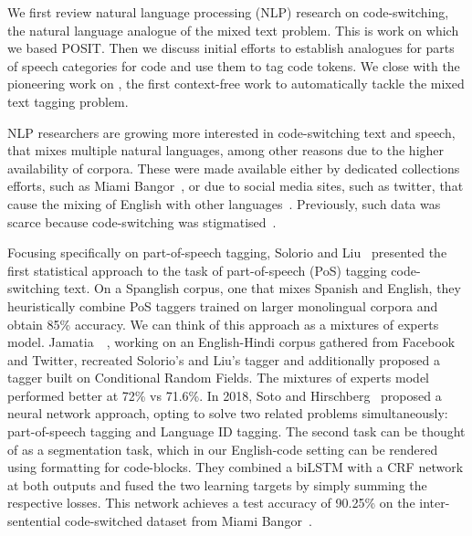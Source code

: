 We first review natural language processing (NLP) research on code-switching,
the natural language analogue of the mixed text problem.  This is work on which
we based POSIT.  Then we discuss initial efforts to establish analogues for
parts of speech categories for code and use them to tag code tokens.  We close
with the pioneering work on \stormed, the first context-free work to
automatically tackle the mixed text tagging problem.

NLP researchers are growing more interested in code-switching text and speech,
\ie that mixes multiple natural languages, among other reasons due to the higher
availability of corpora. These were made available either by dedicated
collections efforts, such as Miami Bangor~\cite{bangorTalk}, or due to social
media sites, such as twitter, that cause the mixing of English with other
languages~\cite{Vyas2014}. Previously, such data was scarce because
code-switching was stigmatised~\cite{Poplack1980}. 

Focusing specifically on part-of-speech tagging, Solorio and
Liu~\cite{Solorio2008} presented the first statistical approach to the task of
part-of-speech (PoS) tagging code-switching text. On a Spanglish corpus, one
that mixes Spanish and English, they heuristically combine PoS taggers trained
on larger monolingual corpora and obtain 85\% accuracy. We can think of this
approach as a mixtures of experts model. Jamatia~\etal~\cite{Jamatia2015},
working on an English-Hindi corpus gathered from Facebook and Twitter, recreated
Solorio's and Liu's tagger and additionally proposed a tagger built on
Conditional Random Fields. The mixtures of experts model performed better at
72\% vs 71.6\%. In 2018, Soto and Hirschberg~\cite{Soto2018} proposed a neural
network approach, opting to solve two related problems simultaneously:
part-of-speech tagging and Language ID tagging. The second task can be thought
of as a segmentation task, which in our English-code setting can be rendered
using formatting for code-blocks. They combined a biLSTM with a CRF network at
both outputs and fused the two learning targets by simply summing the respective
losses. This network achieves a test accuracy of 90.25\% on the inter-sentential
code-switched dataset from Miami Bangor~\cite{bangorTalk}.

